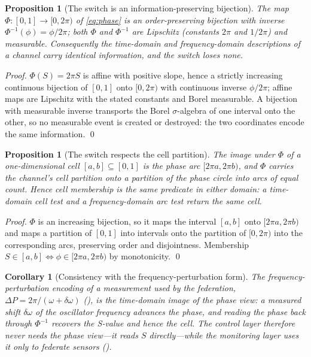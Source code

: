 \documentclass[11pt,a4paper,twocolumn]{article}
\theoremstyle{thmstyle}
\newtheorem{proposition}[theorem]{Proposition}
\newtheorem{corollary}[theorem]{Corollary}
\theoremstyle{definition}
\theoremstyle{remark}
\newcommand{\DP}{\Delta P}
\begin{document}
\begin{proposition}[The switch is an information-preserving bijection]
\label{prop:switch}
The map $\Phi\colon[0,1]\to[0,2\pi)$ of \eqref{eq:phase} is an
order-preserving bijection with inverse $\Phi^{-1}(\phi)=\phi/2\pi$; both
$\Phi$ and $\Phi^{-1}$ are Lipschitz \textup{(}constants $2\pi$ and
$1/2\pi$\textup{)} and measurable. Consequently the time-domain and
frequency-domain descriptions of a channel carry identical information,
and the switch loses none.
\end{proposition}

\begin{proof}
$\Phi(S)=2\pi S$ is affine with positive slope, hence a strictly
increasing continuous bijection of $[0,1]$ onto $[0,2\pi)$ with continuous
inverse $\phi/2\pi$; affine maps are Lipschitz with the stated constants
and Borel measurable. A bijection with measurable inverse transports the
Borel $\sigma$-algebra of one interval onto the other, so no measurable
event is created or destroyed: the two coordinates encode the same
information. \qed
\end{proof}

\begin{proposition}[The switch respects the cell partition]
\label{prop:switch-cells}
The image under $\Phi$ of a one-dimensional cell $[a,b]\subseteq[0,1]$ is
the phase arc $[2\pi a,2\pi b)$, and $\Phi$ carries the channel's cell
partition onto a partition of the phase circle into arcs of equal count.
Hence cell membership is the same predicate in either domain: a
time-domain cell test and a frequency-domain arc test return the same
cell.
\end{proposition}

\begin{proof}
$\Phi$ is an increasing bijection, so it maps the interval $[a,b]$ onto
$[2\pi a,2\pi b)$ and maps a partition of $[0,1]$ into intervals onto the
partition of $[0,2\pi)$ into the corresponding arcs, preserving order and
disjointness. Membership $S\in[a,b]\iff\phi\in[2\pi a,2\pi b)$ by
monotonicity. \qed
\end{proof}

\begin{corollary}[Consistency with the frequency-perturbation form]
\label{cor:switch-freq}
The frequency-perturbation encoding of a measurement used by the
federation, $\DP=2\pi/(\omega+\delta\omega)$
\textup{(}\textup{)}, is the time-domain image of the
phase view: a measured shift $\delta\omega$ of the oscillator frequency
advances the phase, and reading the phase back through $\Phi^{-1}$
recovers the S-value and hence the cell. The control layer therefore never
needs the phase view---it reads $S$ directly---while the monitoring layer
uses it only to federate sensors \textup{(}\textup{)}.
\end{corollary}
\end{document}
